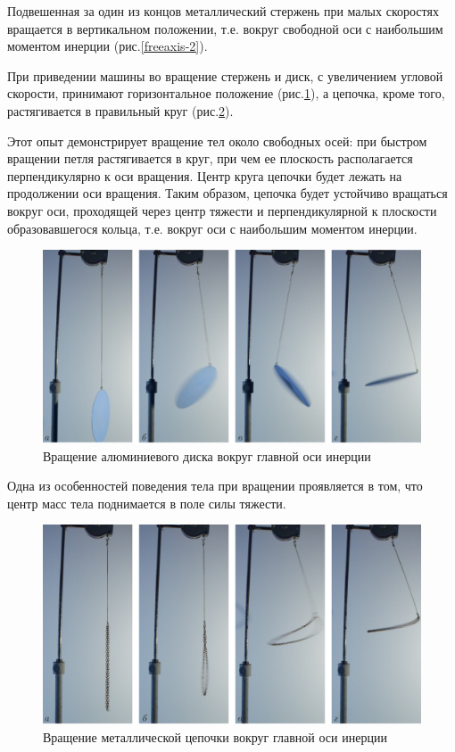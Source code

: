 \documentclass[All.tex]{subfiles}
\begin{document}
Подвешенная за один из концов металлический стержень при малых скоростях вращается в вертикальном положении, т.е. вокруг свободной оси с наибольшим моментом инерции (рис.\ref{freeaxis-2}).


При приведении машины во вращение стержень и диск, с увеличением угловой скорости, принимают горизонтальное положение (рис.\ref{freeaxis-3}), а цепочка, кроме того, растягивается в правильный круг (рис.\ref{freeaxis-4}).

Этот опыт демонстрирует вращение тел около свободных осей: при быстром вращении петля растягивается в круг, при чем ее плоскость располагается перпендикулярно к оси вращения. Центр круга цепочки будет лежать на продолжении оси вращения. Таким образом, цепочка будет устойчиво вращаться вокруг оси, проходящей через центр тяжести и перпендикулярной к плоскости образовавшегося кольца, т.е. вокруг оси с наибольшим моментом инерции.

\begin{figure}[H] 	
	\centering 		
	\includegraphics[width=0.7\linewidth]{freeaxis-3.png}
	\caption{Вращение алюминиевого диска вокруг главной оси инерции}
	\label{freeaxis-3}
\end{figure}

Одна из особенностей поведения тела при вращении проявляется в том, что центр масс тела поднимается в поле силы тяжести.

\begin{figure}[H]
	\centering 	
	\includegraphics[width=0.7\linewidth]{freeaxis-4.png}
	\caption{Вращение металлической цепочки вокруг главной оси инерции}
	\label{freeaxis-4}
\end{figure}
\end{document}
